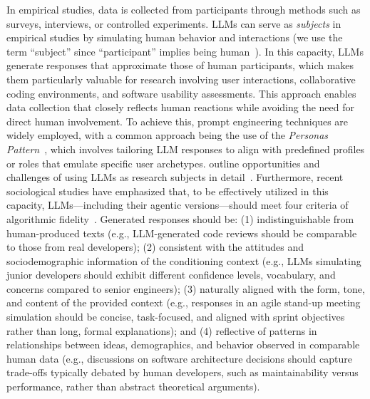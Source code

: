 In empirical studies, data is collected from participants through methods such as surveys, interviews, or controlled experiments.
LLMs can serve as \emph{subjects} in empirical studies by simulating human behavior and interactions (we use the term ``subject'' since ``participant'' implies being human~\cite{apa-dict-subject}).
In this capacity, LLMs generate responses that approximate those of human participants, which makes them particularly valuable for research involving user interactions, collaborative coding environments, and software usability assessments.
This approach enables data collection that closely reflects human reactions while avoiding the need for direct human involvement.
To achieve this, prompt engineering techniques are widely employed, with a common approach being the use of the \textit{Personas Pattern}~\cite{DBLP:journals/corr/abs-2308-07702}, which involves tailoring LLM responses to align with predefined profiles or roles that emulate specific user archetypes.
\citeauthor{ZHAO2025101167} outline opportunities and challenges of using LLMs as research subjects in detail~\cite{ZHAO2025101167}.
Furthermore, recent sociological studies have emphasized that, to be effectively utilized in this capacity, LLMs---including their agentic versions---should meet four criteria of algorithmic fidelity~\cite{DBLP:journals/corr/abs-2209-06899}.
Generated responses should be: (1) indistinguishable from human-produced texts (e.g., LLM-generated code reviews should be comparable to those from real developers); (2) consistent with the attitudes and sociodemographic information of the conditioning context (e.g., LLMs simulating junior developers should exhibit different confidence levels, vocabulary, and concerns compared to senior engineers); (3) naturally aligned with the form, tone, and content of the provided context (e.g., responses in an agile stand-up meeting simulation should be concise, task-focused, and aligned with sprint objectives rather than long, formal explanations); and (4) reflective of patterns in relationships between ideas, demographics, and behavior observed in comparable human data (e.g., discussions on software architecture decisions should capture trade-offs typically debated by human developers, such as maintainability versus performance, rather than abstract theoretical arguments).


